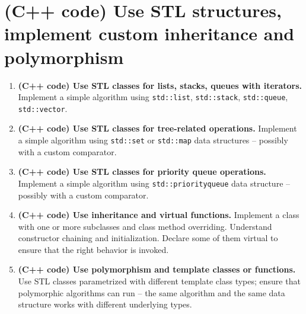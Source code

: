 \documentclass[a4paper,12pt]{article}
\begin{document}
\section{(C++ code) Use STL structures, implement custom inheritance and polymorphism}

\begin{enumerate}[label=6.\Alph*.]
\item {\bf (C++ code) Use STL classes for lists, stacks, queues with iterators.}
Implement a simple algorithm using {\tt std::list}, {\tt std::stack}, {\tt std::queue}, 
{\tt std::vector}.
\item {\bf (C++ code) Use STL classes for tree-related operations.}
Implement a simple algorithm using {\tt std::set} or {\tt std::map} data structures 
-- possibly with a custom comparator.
\item {\bf (C++ code) Use STL classes for priority queue operations.}
Implement a simple algorithm using {\tt std::priority\textunderscore{}queue} data structure
-- possibly with a custom comparator.
\item {\bf (C++ code) Use inheritance and virtual functions.}
Implement a class with one or more subclasses and class method overriding. 
Understand constructor chaining and initialization. 
Declare some of them virtual to ensure that the right behavior is invoked.
\item {\bf (C++ code) Use polymorphism and template classes or functions.}
Use STL classes parametrized with different template class types; 
ensure that polymorphic algorithms can run -- the same algorithm and the same 
data structure works with different underlying types.
\end{enumerate}
\end{document}
